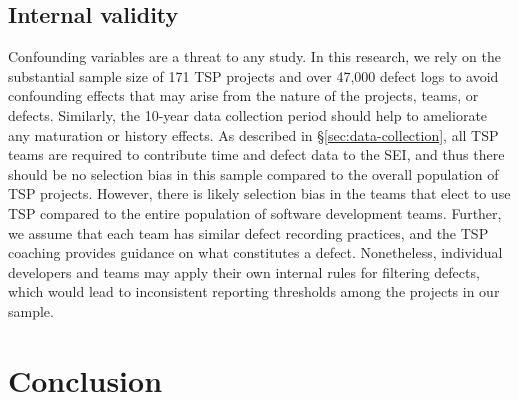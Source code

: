 \documentclass{sig-alternate}
\newcommand{\todo}[1]{\textcolor{Maroon}{TODO: #1}}
\newcommand{\bi}{\begin{itemize}}%
\newcommand{\ei}{\end{itemize}}
\begin{document}
\subsection{Internal validity}
Confounding variables are a threat to any study. In this research, we rely on the substantial sample size of 171 TSP projects and over 47,000 defect logs to avoid confounding effects that may arise from the nature of the projects, teams, or defects. Similarly, the 10-year data collection period should help to ameliorate any maturation or history effects.  As described in \S\ref{sec:data-collection}, all TSP teams are required to contribute time and defect data to the SEI, and thus there should be no selection bias in this sample compared to the overall population of TSP projects. However, there is likely selection bias in the teams that elect to use TSP compared to the entire population of software development teams. Further, we assume that each team has similar defect recording practices, and the TSP coaching provides guidance on what constitutes a defect. Nonetheless, individual developers and teams may apply their own internal rules for filtering defects, which would lead to inconsistent reporting thresholds among the projects in our sample.



 

 
 
 \section{Conclusion}
 
\end{document}
